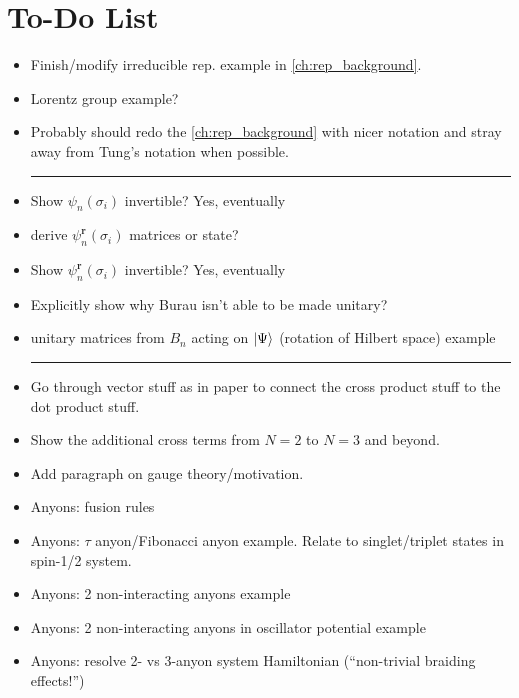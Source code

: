 \chapter{To-Do List}\label{ch:todo}

\begin{itemize}
    \item Finish/modify irreducible rep. example in \cref{ch:rep_background}.
    \item Lorentz group example?
    \item Probably should redo the \cref{ch:rep_background} with nicer notation and stray away from Tung's notation when possible.
    
    \begin{center}\rule{.85\textwidth}{0.65pt}\end{center}
    
    \item Show $\psi_n(\sigma_i)$ invertible? Yes, eventually
    \item derive $\psi_n^\textbf{r}(\sigma_i)$ matrices or state?
    \item Show $\psi_n^\textbf{r}(\sigma_i)$ invertible? Yes, eventually
    \item Explicitly show why Burau isn't able to be made unitary?
    \item unitary matrices from $B_n$ acting on $\ket{\Psi}$ (rotation of Hilbert space) example
    
    \begin{center}\rule{.85\textwidth}{0.65pt}\end{center}
    
    \item Go through vector stuff as in paper to connect the cross product stuff to the dot product stuff.
    \item Show the additional cross terms from $N=2$ to $N=3$ and beyond.
    \item Add paragraph on gauge theory/motivation.
    
    \item Anyons: fusion rules
    \item Anyons: $\tau$ anyon/Fibonacci anyon example. Relate to singlet/triplet states in spin-1/2 system.
    \item Anyons: 2 non-interacting anyons example
    \item Anyons: 2 non-interacting anyons in oscillator potential example
    \item Anyons: resolve 2- vs 3-anyon system Hamiltonian (``non-trivial braiding effects!'')
\end{itemize}
